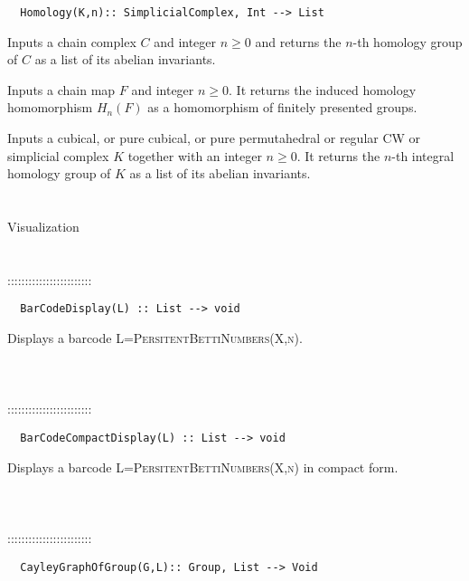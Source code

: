 \documentclass[a4paper,11pt]{report}
\begin{document}
{\begin{verbatim}  Homology(K,n):: SimplicialComplex, Int --> List
\end{verbatim}


 

 Inputs a chain complex $C$ and integer $n \ge 0$ and returns the $n$-th homology group of $C$ as a list of its abelian invariants. 

 Inputs a chain map $F$ and integer $n \ge 0$. It returns the induced homology homomorphism $H_n(F)$ as a homomorphism of finitely presented groups. 

 Inputs a cubical, or pure cubical, or pure permutahedral or regular CW or
simplicial complex $K$ together with an integer $n \ge 0$. It returns the $n$-th integral homology group of $K$ as a list of its abelian invariants. \\
 \\
 \\
 Visualization \\
 \\
 \\
 ::::::::::::::::::::::::\\
 
\begin{verbatim}  BarCodeDisplay(L) :: List --> void
\end{verbatim}


 

Displays a barcode \textsc{L=PersitentBettiNumbers(X,n)}. \\
 \\
 \\
 \\
 ::::::::::::::::::::::::\\
 
\begin{verbatim}  BarCodeCompactDisplay(L) :: List --> void
\end{verbatim}


 

Displays a barcode \textsc{L=PersitentBettiNumbers(X,n)} in compact form. \\
 \\
 \\
 \\
 ::::::::::::::::::::::::\\
 
\begin{verbatim}  CayleyGraphOfGroup(G,L):: Group, List --> Void
\end{verbatim}


}
\end{document}
